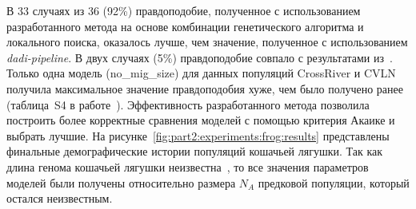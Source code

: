 В 33 случаях из 36 (92\%) правдоподобие, полученное с использованием разработанного метода на основе комбинации генетического алгоритма и локального поиска, оказалось лучше, чем значение, полученное с использованием \textit{dadi-pipeline}.
В двух случаях (5\%) правдоподобие совпало с результатами из~\cite{portik2017evaluating}.
Только одна модель (no\_mig\_size) для данных популяций CrossRiver и CVLN получила максимальное значение правдоподобия хуже, чем было получено ранее (таблица~S4 в работе~\cite{noskova2020gadma}).
Эффективность разработанного метода позволила построить более корректные сравнения моделей с помощью критерия Акаике и выбрать лучшие.
На рисунке~\ref{fig:part2:experiments:frog:results} представлены финальные демографические истории популяций кошачьей лягушки.
Так как длина генома кошачьей лягушки неизвестна~\cite{portik2017evaluating}, то все значения параметров моделей были получены относительно размера $N_A$ предковой популяции, который остался неизвестным.

